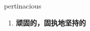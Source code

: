 
\begin{frame}
{\huge pertinacious}
\begin{center}
\begin{enumerate}\Large
  \item \textbf{顽固的，固执地坚持的}
\end{enumerate}
\end{center}
\end{frame}

